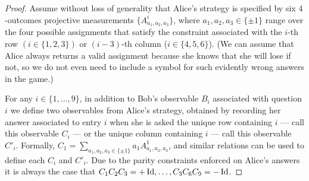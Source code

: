\begin{proof}
Assume without loss of generality that Alice's strategy is specified by six $4$-outcomes projective measurements $\{A^i_{a_1,a_2,a_3}\}$, where $a_1,a_2,a_3\in\{\pm 1\}$ range over the four possible assignments that satisfy the constraint associated with the $i$-th row $(i\in \{1,2,3\})$ or $(i-3)$-th column ($i\in \{4,5,6\}$). (We can assume that Alice always returns a valid assignment because she knows that she will lose if not, so we do not even need to include a symbol for such evidently wrong answers in the game.)

For any $i\in\{1,\ldots,9\}$, in addition to Bob's observable $B_i$ associated with question $i$ we define two observables from Alice's strategy, obtained by recording her answer associated to entry $i$ when she is asked the unique row containing $i$ --- call this observable $C_i$ --- or the unique column containing $i$ --- call this observable $C'_i$. Formally, $C_1 = \sum_{a_1,a_2,a_3\in\{\pm 1\}}a_1 A^1_{a_1,a_2,a_3}$, and similar relations can be used to define each $C_i$ and $C'_i$. Due to the parity constraints enforced on Alice's answers it is always the case that $C_1C_2C_3=+\mathop{\rm Id}\nolimits,\ldots,C_3C_6C_9=-\mathop{\rm Id}\nolimits$.
 

\end{proof}
